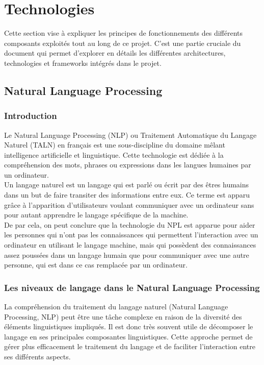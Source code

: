 \documentclass{rapport}
\begin{document}

\newpage
\section{Technologies}
\label{TechnoUse}
Cette section vise à expliquer les principes de fonctionnements des différents composants exploités tout au long de ce projet. C'est une partie cruciale du document qui permet d'explorer en détails les différentes architectures, technologies et frameworks intégrés dans le projet.
\subsection{Natural Language Processing}
\label{subsec:NLP}
\subsubsection{Introduction}
Le Natural Language Processing (NLP) ou Traitement Automatique du Langage Naturel (TALN) en français est une sous-discipline du domaine mêlant intelligence artificielle et linguistique. Cette technologie est dédiée à la compréhension des mots, phrases ou expressions dans les langues humaines par un ordinateur.\\

Un langage naturel est un langage qui est parlé ou écrit par des êtres humains dans un but de faire transiter des informations entre eux. Ce terme est apparu grâce à l'apparition d'utilisateurs voulant communiquer avec un ordinateur sans pour autant apprendre le langage spécifique de la machine. \\

De par cela, on peut conclure que la technologie du NPL est apparue pour aider les personnes qui n'ont pas les connaissances qui permettent l'interaction avec un ordinateur en utilisant le langage machine, mais qui possèdent des connaissances assez poussées dans un langage humain que pour communiquer avec une autre personne, qui est dans ce cas remplacée par un ordinateur. 

\subsubsection{Les niveaux de langage dans le Natural Language Processing}
La compréhension du traitement du langage naturel (Natural Language Processing, NLP) peut être une tâche complexe en raison de la diversité des éléments linguistiques impliqués. Il est donc très souvent utile de décomposer le langage en ses principales composantes linguistiques. Cette approche permet de gérer plus efficacement le traitement du langage et de faciliter l'interaction entre ses différents aspects.\\
\end{document}
